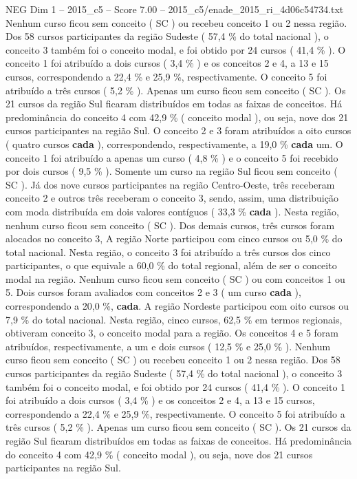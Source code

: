 \begin{textsample}{NEG Dim 1 – 2015\_c5 – Score 7.00 – 2015\_c5/enade\_2015\_ri\_4d06c54734.txt}
Nenhum curso ficou sem conceito ( SC ) ou recebeu conceito 1 ou 2 nessa região.
Dos 58 cursos participantes da região Sudeste ( 57,4 \% do total nacional ), o conceito 3 também foi o conceito modal, e foi obtido por 24 cursos ( 41,4 \% ).
O conceito 1 foi atribuído a dois cursos ( 3,4 \% ) e os conceitos 2 e 4, a 13 e 15 cursos, correspondendo a 22,4 \% e 25,9 \%, respectivamente.
O conceito 5 foi atribuído a três cursos ( 5,2 \% ).
Apenas um curso ficou sem conceito ( SC ).
Os 21 cursos da região Sul ficaram distribuídos em todas as faixas de conceitos.
Há predominância do conceito 4 com 42,9 \% ( conceito modal ), ou seja, nove dos 21 cursos participantes na região Sul.
O conceito 2 e 3 foram atribuídos a oito cursos ( quatro cursos \textbf{cada} ), correspondendo, respectivamente, a 19,0 \% \textbf{cada} um.
O conceito 1 foi atribuído a apenas um curso ( 4,8 \% ) e o conceito 5 foi recebido por dois cursos ( 9,5 \% ).
Somente um curso na região Sul ficou sem conceito ( SC ).
Já dos nove cursos participantes na região Centro-Oeste, três receberam conceito 2 e outros três receberam o conceito 3, sendo, assim, uma distribuição com moda distribuída em dois valores contíguos ( 33,3 \% \textbf{cada} ).
Nesta região, nenhum curso ficou sem conceito ( SC ).
Dos demais cursos, três cursos foram alocados no conceito 3, A região Norte participou com cinco cursos ou 5,0 \% do total nacional.
Nesta região, o conceito 3 foi atribuído a três cursos dos cinco participantes, o que equivale a 60,0 \% do total regional, além de ser o conceito modal na região.
Nenhum curso ficou sem conceito ( SC ) ou com conceitos 1 ou 5.
Dois cursos foram avaliados com conceitos 2 e 3 ( um curso \textbf{cada} ), correspondendo a 20,0 \%, \textbf{cada}.
A região Nordeste participou com oito cursos ou 7,9 \% do total nacional.
Nesta região, cinco cursos, 62,5 \% em termos regionais, obtiveram conceito 3, o conceito modal para a região.
Os conceitos 4 e 5 foram atribuídos, respectivamente, a um e dois cursos ( 12,5 \% e 25,0 \% ).
Nenhum curso ficou sem conceito ( SC ) ou recebeu conceito 1 ou 2 nessa região.
Dos 58 cursos participantes da região Sudeste ( 57,4 \% do total nacional ), o conceito 3 também foi o conceito modal, e foi obtido por 24 cursos ( 41,4 \% ).
O conceito 1 foi atribuído a dois cursos ( 3,4 \% ) e os conceitos 2 e 4, a 13 e 15 cursos, correspondendo a 22,4 \% e 25,9 \%, respectivamente.
O conceito 5 foi atribuído a três cursos ( 5,2 \% ).
Apenas um curso ficou sem conceito ( SC ).
Os 21 cursos da região Sul ficaram distribuídos em todas as faixas de conceitos.
Há predominância do conceito 4 com 42,9 \% ( conceito modal ), ou seja, nove dos 21 cursos participantes na região Sul.

\end{textsample}

